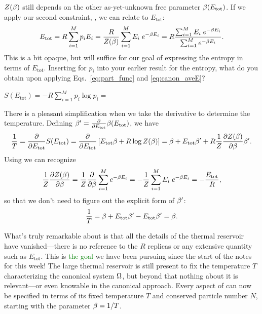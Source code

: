 $Z(\beta)$ still depends on the other as-yet-unknown free parameter $\beta(E_{\text{tot}})$.
If we apply our second constraint, , we can relate \be to $E_{\text{tot}}$:
\begin{equation}
  \label{eq:canon_aveE}
  E_{\text{tot}} = R \sum_{i = 1}^M p_i E_i = \frac{R}{Z(\beta)} \sum_{i = 1}^M E_i \; e^{-\beta E_i} = R \frac{\sum_{i = 1}^M E_i \; e^{-\beta E_i}}{\sum_{i = 1}^M e^{-\beta E_i}}.
\end{equation}
This is a bit opaque, but will suffice for our goal of expressing the entropy in terms of $E_{\text{tot}}$.
Inserting  for $p_i$ into your earlier result for the entropy, what do you obtain upon applying Eqs.~\ref{eq:part_func} and \ref{eq:canon_aveE}?
\begin{mdframed}
  $\displaystyle S(E_{\text{tot}}) = -R \sum_{i = 1}^M p_i \log p_i = $ \\[100 pt]
\end{mdframed}
There is a pleasant simplification when we take the derivative to determine the temperature.
Defining $\beta' = \frac{\partial }{\partial E_{\text{tot}}} \beta(E_{\text{tot}})$, we have
\begin{equation*}
  \frac{1}{T} = \frac{\partial }{\partial E_{\text{tot}}} S(E_{\text{tot}}) = \frac{\partial }{\partial E_{\text{tot}}} \left[E_{\text{tot}} \beta + R\log Z(\beta)\right] = \beta + E_{\text{tot}} \beta' + R \frac{1}{Z} \frac{\partial Z(\beta)}{\partial \beta} \beta' .
\end{equation*}
Using  we can recognize
\begin{equation*}
  \frac{1}{Z} \frac{\partial Z(\beta)}{\partial \beta} = \frac{1}{Z} \frac{\partial }{\partial \beta} \sum_{i = 1}^M e^{-\beta E_i} = -\frac{1}{Z} \sum_{i = 1}^M E_i \; e^{-\beta E_i} = -\frac{E_{\text{tot}}}{R},
\end{equation*}
so that we don't need to figure out the explicit form of $\beta'$:
\begin{equation}
  \label{eq:beta}
  \frac{1}{T} = \beta + E_{\text{tot}} \beta' - E_{\text{tot}} \beta' = \beta .
\end{equation}

What's truly remarkable about  is that all the details of the thermal reservoir have vanished---there is no reference to the $R$ replicas or any extensive quantity such as $E_{\text{tot}}$.
This is \textcolor{green}{the goal} we have been pursuing since the start of the notes for this week!
The large thermal reservoir is still present to fix the temperature $T$ characterizing the canonical system $\Omega$, but beyond that nothing about it is relevant---or even knowable in the canonical approach.
Every aspect of \Om can now be specified in terms of its fixed temperature $T$ and conserved particle number $N$, starting with the parameter $\beta = 1 / T$.

